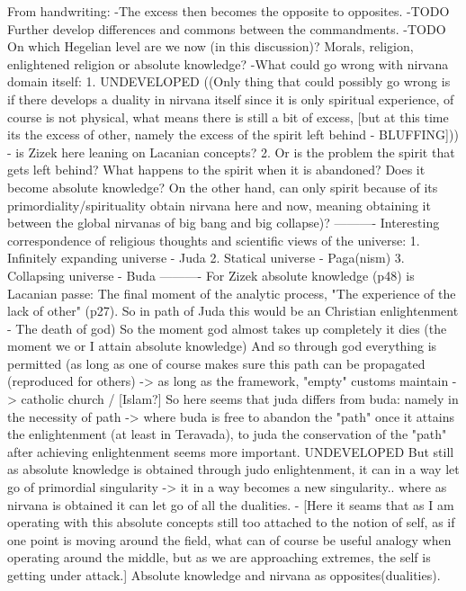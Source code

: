 \documentclass{book}
\begin{document}
From handwriting:
-The excess then becomes the opposite to opposites.
-TODO Further develop differences and commons between the commandments.
-TODO On which Hegelian level are we now (in this discussion)? Morals, religion, enlightened religion or absolute knowledge? 
-What could go wrong with nirvana domain itself:
1. UNDEVELOPED ((Only thing that could possibly go wrong is if there develops a duality in nirvana itself since it is only spiritual experience, of course is not physical, what means there is still a bit of excess, [but at this time its the excess of other, namely the excess of the spirit left behind - BLUFFING])) - is Zizek here leaning on Lacanian concepts?
2. Or is the problem the spirit that gets left behind? What happens to the spirit when it is abandoned? Does it become absolute knowledge? On the other hand, can only spirit because of its primordiality/spirituality obtain nirvana here and now, meaning obtaining it between the global nirvanas of big bang and big collapse)?
----------
Interesting correspondence of religious thoughts and scientific views of the universe:
1. Infinitely expanding universe - Juda
2. Statical universe - Paga(nism)
3. Collapsing universe - Buda
----------
For Zizek absolute knowledge (p48) is Lacanian passe: 
The final moment of the analytic process, "The experience of the lack of other" (p27). So in path of Juda this would be an Christian enlightenment - The death of god) So the moment god almost takes up completely it dies (the moment we or I attain absolute knowledge) And so through god everything is permitted (as long as one of course makes sure this path can be propagated (reproduced for others) -> as long as the framework, "empty" customs maintain -> catholic church / [Islam?]
So here seems that juda differs from buda: namely in the necessity of path -> where buda is free to abandon the "path" once it attains the enlightenment (at least in Teravada), to juda the conservation of the "path" after achieving enlightenment seems more important.
UNDEVELOPED But still as absolute knowledge is obtained through judo enlightenment, it can in a way let go of primordial singularity -> it in a way becomes a new singularity.. where as nirvana is obtained it can let go of all the dualities. - [Here it seams that as I am operating with this absolute concepts still too attached to the notion of self, as if one point is moving around the field, what can of course be useful analogy when operating around the middle, but as we are approaching extremes, the self is getting under attack.]
Absolute knowledge and nirvana as opposites(dualities).
\end{document}
